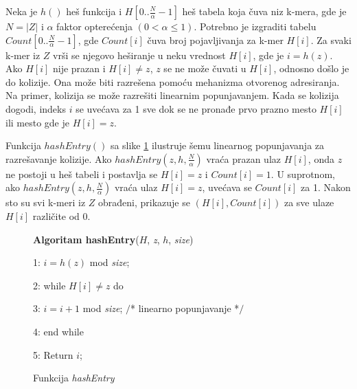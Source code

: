 \documentclass[12pt,oneside]{memoir}
\begin{document}
Neka je $h()$ heš funkcija i $H[0..\frac{N}{\alpha} - 1]$ heš tabela koja čuva niz k-mera, gde je $N = |Z|$ i $\alpha$ faktor opterećenja $(0 < \alpha \leq 1)$. Potrebno je izgraditi tabelu $Count[0..\frac{N}{\alpha} - 1]$, gde $Count[i]$ čuva broj pojavljivanja za k-mer $H[i]$. Za svaki k-mer iz $Z$ vrši se njegovo  heširanje u neku vrednost $H[i]$, gde je $i = h(z)$. Ako $H[i]$ nije prazan i $H[i] \neq z$, $z$ se ne može čuvati u $H[i]$, odnosno došlo je do kolizije. Ona može biti razrešena pomoću mehanizma otvorenog adresiranja. Na primer, kolizija se može razrešiti linearnim popunjavanjem. Kada se kolizija dogodi, indeks $i$ se uvećava za 1 sve dok se ne pronađe prvo prazno mesto $H[i]$ ili mesto gde je $H[i] = z$.

\begin{comment}

\begin{figure}[!ht]
  \centering
  \texttt{[image: HashEntry.PNG]}
  \caption{Funkcija hashEntry \cite{WingKinSung}}
  \label{fig:hashEntry}
\end{figure}

\end{comment}

Funkcija $hashEntry()$ sa slike \ref{box:hashEntry} ilustruje šemu linearnog popunjavanja za razrešavanje kolizije. Ako $hashEntry(z, h, \frac{N}{\alpha})$ vraća prazan ulaz $H[i]$, onda $z$ ne postoji u heš tabeli i postavlja se $H[i] = z$ i $Count[i] = 1$. U suprotnom, ako $hashEntry(z, h, \frac{N}{\alpha})$ vraća ulaz $H[i] = z$, uvećava se $Count[i]$ za 1. Nakon sto su svi k-meri iz $Z$ obrađeni, prikazuje se $(H[i], Count[i])$ za sve ulaze $H[i]$ različite od 0.

\begin{figure}[!ht]
\begin{tcolorbox}
\textbf{Algoritam hashEntry}($H$, \textit{z}, $h$, \textit{size})

1: $i = h(z)$ mod \textit{size};

2: while $H[i] \neq z$ do

3:\hspace{1cm} $i = i + 1$ mod \textit{size}; $/$* linearno popunjavanje *$/$

4: end while

5: Return $i$;
\end{tcolorbox}
\caption{Funkcija \textit{hashEntry} \cite{WingKinSung}}
\label{box:hashEntry}
\end{figure}
\end{document}
